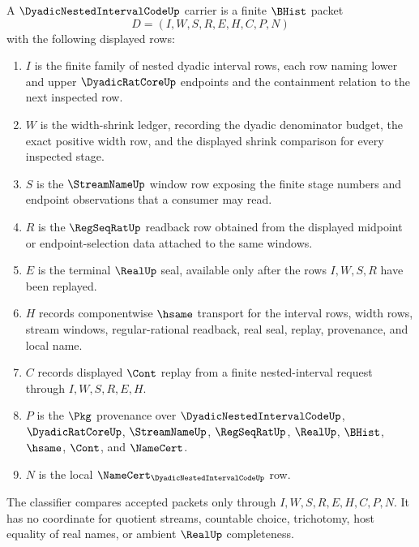 \begin{definition}
\label{def:dyadic-nested-interval-code-carrier}
A $\DyadicNestedIntervalCodeUp$ carrier is a finite $\BHist$ packet
$$
D=(I,W,S,R,E,H,C,P,N)
$$
with the following displayed rows:
\begin{enumerate}
\item $I$ is the finite family of nested dyadic interval rows, each row naming lower and upper $\DyadicRatCoreUp$ endpoints and the containment relation to the next inspected row.
\item $W$ is the width-shrink ledger, recording the dyadic denominator budget, the exact positive width row, and the displayed shrink comparison for every inspected stage.
\item $S$ is the $\StreamNameUp$ window row exposing the finite stage numbers and endpoint observations that a consumer may read.
\item $R$ is the $\RegSeqRatUp$ readback row obtained from the displayed midpoint or endpoint-selection data attached to the same windows.
\item $E$ is the terminal $\RealUp$ seal, available only after the rows $I,W,S,R$ have been replayed.
\item $H$ records componentwise $\hsame$ transport for the interval rows, width rows, stream windows, regular-rational readback, real seal, replay, provenance, and local name.
\item $C$ records displayed $\Cont$ replay from a finite nested-interval request through $I,W,S,R,E,H$.
\item $P$ is the $\Pkg$ provenance over $\DyadicNestedIntervalCodeUp$, $\DyadicRatCoreUp$, $\StreamNameUp$, $\RegSeqRatUp$, $\RealUp$, $\BHist$, $\hsame$, $\Cont$, and $\NameCert$.
\item $N$ is the local $\NameCert_{\DyadicNestedIntervalCodeUp}$ row.
\end{enumerate}
The classifier compares accepted packets only through $I,W,S,R,E,H,C,P,N$. It has no coordinate for quotient streams, countable choice, trichotomy, host equality of real names, or ambient $\RealUp$ completeness.
\end{definition}


